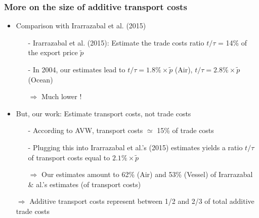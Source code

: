 \documentclass[10 pt,Helvetica, french]{beamer}
\begin{document}
\begin{frame}[label = app_comparison]
\frametitle{More on the size of additive transport costs}
\begin{itemize}
\item Comparison with Irarrazabal et al. (2015) \vspace{0.1cm}
\begin{itemize}
\item[-] Irarrazabal et al. (2015): Estimate the trade costs ratio $t/\tau$ = 14\% of the export price $\widetilde{p}$ \vspace{0.1cm}
\item[-] In 2004, our estimates lead to $t/\tau = 1.8\% \times \widetilde{p}$ (Air), $t/\tau = 2.8\%\times \widetilde{p}$ (Ocean) \vspace{0.1cm}
\item[$\Rightarrow$] Much lower !
\end{itemize}
\item But, our work: Estimate transport costs, not trade costs \vspace{0.1cm}
\begin{itemize}
\item[-] According to AVW, transport costs $\simeq$ 15\% of trade costs \vspace{0.1cm}
\item[-] Plugging this into Irarrazabal et al.'s (2015) estimates yields a ratio $t/\tau$ of transport costs equal to $2.1\% \times \widetilde{p}$
\item[$\Rightarrow$] Our estimates amount to 62\% (Air) and 53\% (Vessel) of Irarrazabal \& al.'s estimates (of transport costs)\vspace{0.1cm}
\end{itemize}
\item[$\Rightarrow$] Additive transport costs represent between 1/2 and 2/3 of total additive trade costs
\end{itemize}
\hyperlink{slide_result1}{}
\end{frame}
\end{document}
